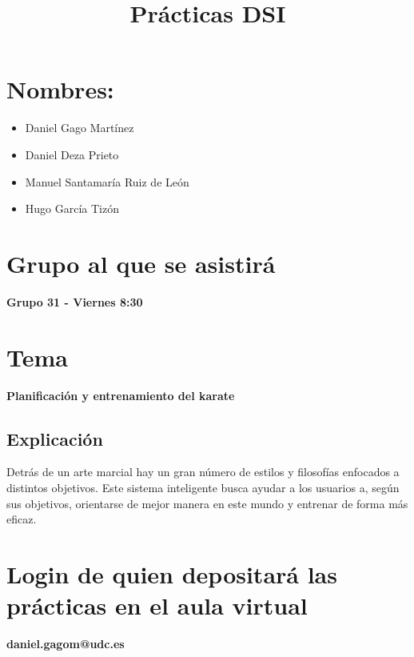 \documentclass{article}
\title{Prácticas DSI}
\date{}
\begin{document}
\maketitle

\section{Nombres:}
    \begin{itemize}
        \item Daniel Gago Martínez
        \item Daniel Deza Prieto
        \item Manuel Santamaría Ruiz de León
        \item Hugo García Tizón
    \end{itemize}
    
\section{Grupo al que se asistirá}
    \textbf{Grupo 31 - Viernes 8:30}
    
\section{Tema}
    \textbf{Planificación y entrenamiento del karate}
    
    \subsection{Explicación}
        Detrás de un arte marcial hay un gran número de estilos y filosofías enfocados a distintos objetivos. Este sistema inteligente busca ayudar a los usuarios a, según sus objetivos, orientarse de mejor manera en este mundo y entrenar de forma más eficaz.
        
\section{Login de quien depositará las prácticas en el aula virtual}
    \textbf{daniel.gagom@udc.es}
\end{document}
